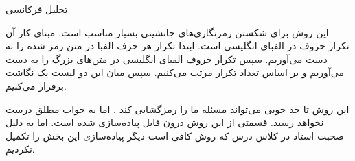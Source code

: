 \SubProblem
{تحلیل فرکانسی}
{
این روش برای شکستن رمزنگاری‌های جانشینی بسیار مناسب است. مبنای کار آن تکرار حروف در الفبای انگلیسی است.
ابتدا تکرار هر حرف الفبا در متن رمز شده را به دست می‌آوریم.
سپس تکرار حروف الفبای انگلیسی در متن‌های بزرگ را به دست می‌آوریم و بر اساس تعداد تکرار مرتب می‌کنیم.
سپس میان این دو لیست یک نگاشت برقرار می‌کنیم.

این روش تا حد خوبی می‌تواند مسئله ما را رمزگشایی کند . اما به جواب مطلق درست نخواهد رسید.
قسمتی از این روش درون فایل
پیاده‌سازی شده است.
اما به دلیل صحبت استاد در کلاس درس که روش
کافی است دیگر پیاده‌سازی این بخش را تکمیل نکردیم.
}
